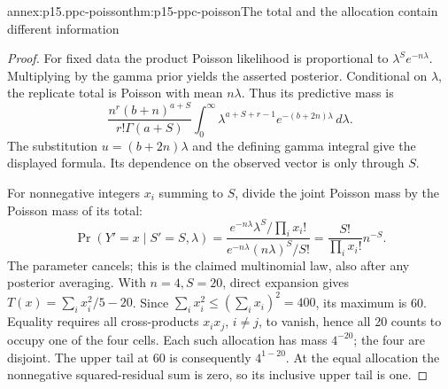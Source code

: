 \begin{annexitem}{annex:p15.ppc-poisson}{thm:p15-ppc-poisson}{The total and the allocation contain different information}
\begin{proof}
For fixed data the product Poisson likelihood is proportional to
\(\lambda^S e^{-n\lambda}\). Multiplying by the gamma prior yields
the asserted posterior. Conditional on \(\lambda\), the replicate total
is Poisson with mean \(n\lambda\). Thus its predictive mass is
\[
 \frac{n^r(b+n)^{a+S}}{r!\Gamma(a+S)}
 \int_0^\infty \lambda^{a+S+r-1}e^{-(b+2n)\lambda}\,d\lambda.
\]
The substitution \(u=(b+2n)\lambda\) and the defining gamma integral
give the displayed formula. Its dependence on the observed vector is
only through \(S\).

For nonnegative integers \(x_i\) summing to \(S\), divide the joint
Poisson mass by the Poisson mass of its total:
\[
 \Pr(Y'=x\mid S'=S,\lambda)
 =\frac{e^{-n\lambda}\lambda^S/\prod_i x_i!}
        {e^{-n\lambda}(n\lambda)^S/S!}
 =\frac{S!}{\prod_i x_i!}n^{-S}.
\]
The parameter cancels; this is the claimed multinomial law, also after
any posterior averaging. With \(n=4,S=20\), direct expansion gives
\(T(x)=\sum_i x_i^2/5-20\). Since
\(\sum_i x_i^2\leq(\sum_i x_i)^2=400\), its maximum is 60.
Equality requires all cross-products \(x_ix_j\), \(i\ne j\), to
vanish, hence all 20 counts to occupy one of the four cells. Each such
allocation has mass \(4^{-20}\); the four are disjoint. The upper
tail at 60 is consequently \(4^{1-20}\). At the equal allocation the
nonnegative squared-residual sum is zero, so its inclusive upper tail is one.
\end{proof}
\end{annexitem}

